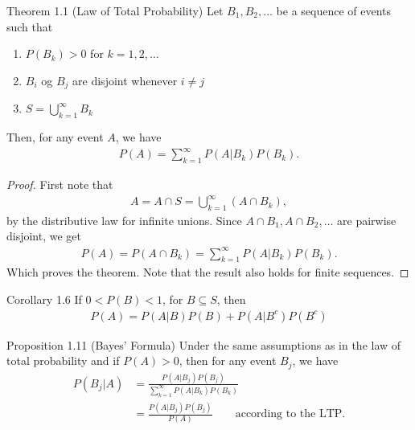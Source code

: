 \begin{boks}{Theorem 1.1 (Law of Total Probability)}
    Let $B_1, B_2, \ldots$ be a sequence of events such that
    \begin{enumerate}
        \item $P(B_k) > 0$ for $k = 1, 2, \ldots$
        \item $B_i$ og $B_j$ are disjoint whenever $i \neq j$
        \item $S = \bigcup_{k=1}^\infty B_k$
    \end{enumerate}
    Then, for any event $A$, we have
    \begin{align*}
        P(A) = \sum_{k=1}^\infty P(A|B_k)P(B_k).
    \end{align*}
\end{boks}

\begin{proof}
First note that
\begin{align*}
    A = A \cap S = \bigcup_{k = 1}^\infty (A \cap B_k),
\end{align*}
by the distributive law for infinite unions. Since $A \cap B_1, A \cap B_2, \ldots$ are pairwise disjoint,  we get
\begin{align*}
    P(A) = P(A \cap B_k) = \sum_{k = 1}^\infty P(A|B_k)P(B_k).
\end{align*}
Which proves the theorem. Note that the result also holds for finite sequences.
\end{proof}

\begin{boks}{Corollary 1.6}
If $0 < P(B) < 1$, for $B\subseteq S$, then
\begin{align*}
    P(A) = P(A|B)P(B) + P(A|B^c)P(B^c)
\end{align*}
\end{boks}

\begin{boks}{Proposition 1.11 (Bayes' Formula)}
Under the same assumptions as in the law of total probability and if $P(A) > 0$, then for any event $B_j$, we have
\begin{align*}
    P(B_j|A) &= \frac{P(A|B_j)P(B_j)}{\sum_{k=1}^\infty P(A|B_k)P(B_k)} \\
    &= \frac{P(A|B_j)P(B_j)}{P(A)} \qquad \text{according to the LTP.}
\end{align*}
\end{boks}
